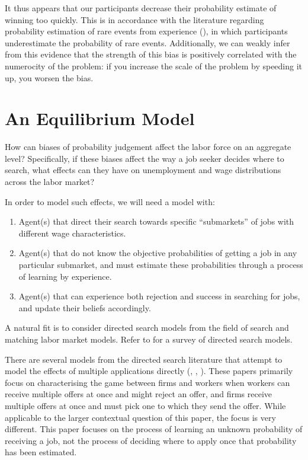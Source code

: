 \documentclass[a4paper,12pt]{article}
\begin{document}
It thus appears that our participants decrease their probability estimate of winning too quickly. This is in accordance with the literature regarding probability estimation of rare events from experience (\cite{hertwig2004}), in which participants underestimate the probability of rare events. Additionally, we can weakly infer from this evidence that the strength of this bias is positively correlated with the numerocity of the problem: if you increase the scale of the problem by speeding it up, you worsen the bias.


\section{ An Equilibrium Model }

How can biases of probability judgement affect the labor force on an aggregate level? Specifically, if these biases affect the way a job seeker decides where to search, what effects can they have on unemployment and wage distributions across the labor market?

In order to model such effects, we will need a model with:
%
\begin{enumerate}
\item Agent(s) that direct their search towards specific ``submarkets'' of jobs with different wage characteristics.
\item Agent(s) that do not know the objective probabilities of getting a job in any particular submarket, and must estimate these probabilities through a process of learning by experience.
\item Agent(s) that can experience both rejection and success in searching for jobs, and update their beliefs accordingly.
\end{enumerate}
%
A natural fit is to consider directed search models from the field of search and matching labor market models. Refer to \cite{wright2017} for a survey of directed search models.

There are several models from the directed search literature that attempt to model the effects of multiple applications directly (\cite{albrecht2006}, \cite{galenianos2009}, \cite{wolthoff2017}). These papers primarily focus on characterising the game between firms and workers when workers can receive multiple offers at once and might reject an offer, and firms receive multiple offers at once and must pick one to which they send the offer. While applicable to the larger contextual question of this paper, the focus is very different. This paper focuses on the process of learning an unknown probability of receiving a job, not the process of deciding where to apply once that probability has been estimated.
\end{document}
